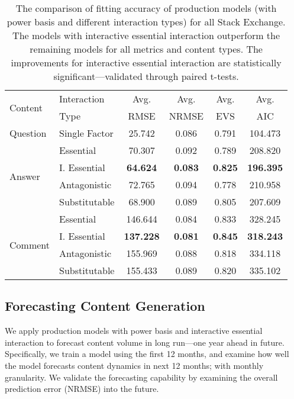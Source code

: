 \begin{table}[ht]
	\vspace{-0.5\baselineskip}
	\caption{The comparison of fitting accuracy of production models (with power basis and different interaction types) for all Stack Exchange. The models with interactive essential interaction outperform the remaining models for all metrics and content types. The improvements for interactive essential interaction are statistically significant---validated through paired t-tests.}
    \vspace{-\baselineskip}
	\label{tbl:model_fit}
	\begin{center}
	\begin{tabular}{llcccc}
    \toprule
    \multirow{2}{*}{Content} & Interaction & Avg. & Avg. & Avg. & Avg.\\
    & Type & RMSE & NRMSE & EVS & AIC\\
    \midrule
    Question & Single Factor & 25.742 & 0.086 & 0.791 & 104.473\\
    \midrule
    \multirow{4}{*}{Answer} & Essential & 70.307 & 0.092 & 0.789 & 208.820\\
    & I. Essential & \textbf{64.624} & \textbf{0.083} & \textbf{0.825} & \textbf{196.395}\\
    & Antagonistic & 72.765 & 0.094 &  0.778 & 210.958\\
    & Substitutable & 68.900 & 0.089 & 0.805 & 207.609\\
    \midrule
    \multirow{4}{*}{Comment} & Essential & 146.644 & 0.084 & 0.833 & 328.245\\
    & I. Essential & \textbf{137.228} & \textbf{0.081} & \textbf{0.845} & \textbf{318.243}\\
    & Antagonistic & 155.969 & 0.088 &  0.818 & 334.118\\
    & Substitutable & 155.433 & 0.089 & 0.820 & 335.102\\
    \bottomrule
	\end{tabular}
	\end{center}
    \vspace{-\baselineskip}
\end{table}

\subsection{Forecasting Content Generation} 
We apply production models with power basis and interactive essential interaction to forecast content volume in long run---one year ahead in future. Specifically, we train a model using the first 12 months, and examine how well the model forecasts content dynamics in next 12 months; with monthly granularity. We validate the forecasting capability by examining the overall prediction error (NRMSE) into the future. 


